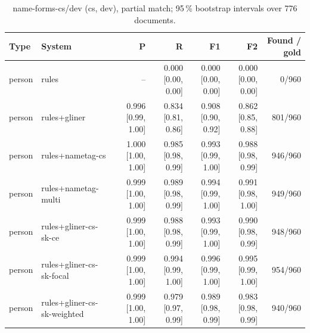\providecommand{\ci}[2]{{\scriptsize [#1, #2]}}

\begin{table}[htbp]
\centering
\small
\begin{tabular}{llrrrrr}
\toprule
Type & System & P & R & F1 & F2 & Found / gold \\
\midrule
person & rules & -- & 0.000 \ci{0.00}{0.00} & 0.000 \ci{0.00}{0.00} & 0.000 \ci{0.00}{0.00} & 0/960 \\
person & rules+gliner & 0.996 \ci{0.99}{1.00} & 0.834 \ci{0.81}{0.86} & 0.908 \ci{0.90}{0.92} & 0.862 \ci{0.85}{0.88} & 801/960 \\
person & rules+nametag-cs & 1.000 \ci{1.00}{1.00} & 0.985 \ci{0.98}{0.99} & 0.993 \ci{0.99}{1.00} & 0.988 \ci{0.98}{0.99} & 946/960 \\
person & rules+nametag-multi & 0.999 \ci{1.00}{1.00} & 0.989 \ci{0.98}{0.99} & 0.994 \ci{0.99}{1.00} & 0.991 \ci{0.98}{1.00} & 949/960 \\
person & rules+gliner-cs-sk-ce & 0.999 \ci{1.00}{1.00} & 0.988 \ci{0.98}{0.99} & 0.993 \ci{0.99}{1.00} & 0.990 \ci{0.98}{0.99} & 948/960 \\
person & rules+gliner-cs-sk-focal & 0.999 \ci{1.00}{1.00} & 0.994 \ci{0.99}{1.00} & 0.996 \ci{0.99}{1.00} & 0.995 \ci{0.99}{1.00} & 954/960 \\
person & rules+gliner-cs-sk-weighted & 0.999 \ci{1.00}{1.00} & 0.979 \ci{0.97}{0.99} & 0.989 \ci{0.98}{0.99} & 0.983 \ci{0.98}{0.99} & 940/960 \\
\bottomrule
\end{tabular}
\caption{name-forms-cs/dev (cs, dev), partial match; 95\,\% bootstrap intervals over 776 documents.}
\label{tab:name-forms-dev-name-forms-cs-dev-partial}
\end{table}

